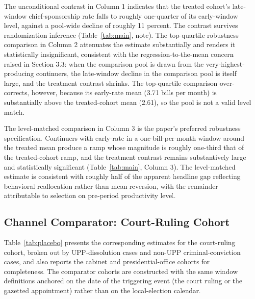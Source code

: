 \documentclass[11pt]{article}
\begin{document}
The unconditional contrast in Column 1 indicates that the treated cohort's late-window chief-sponsorship rate falls to roughly one-quarter of its early-window level, against a pool-wide decline of roughly 11 percent. The contrast survives randomization inference (Table~\ref{tab:main}, note). The top-quartile robustness comparison in Column 2 attenuates the estimate substantially and renders it statistically insignificant, consistent with the regression-to-the-mean concern raised in Section 3.3: when the comparison pool is drawn from the very-highest-producing continuers, the late-window decline in the comparison pool is itself large, and the treatment contrast shrinks. The top-quartile comparison over-corrects, however, because its early-rate mean (3.71 bills per month) is substantially above the treated-cohort mean (2.61), so the pool is not a valid level match.

The level-matched comparison in Column 3 is the paper's preferred robustness specification. Continuers with early-rate in a one-bill-per-month window around the treated mean produce a ramp whose magnitude is roughly one-third that of the treated-cohort ramp, and the treatment contrast remains substantively large and statistically significant (Table~\ref{tab:main}, Column 3). The level-matched estimate is consistent with roughly half of the apparent headline gap reflecting behavioral reallocation rather than mean reversion, with the remainder attributable to selection on pre-period productivity level.

\subsection{Channel Comparator: Court-Ruling Cohort}

Table~\ref{tab:placebo} presents the corresponding estimates for the court-ruling cohort, broken out by UPP-dissolution cases and non-UPP criminal-conviction cases, and also reports the cabinet and presidential-office cohorts for completeness. The comparator cohorts are constructed with the same window definitions anchored on the date of the triggering event (the court ruling or the gazetted appointment) rather than on the local-election calendar.
\end{document}
